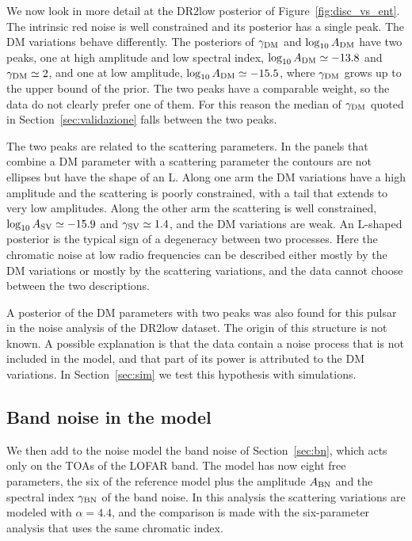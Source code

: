 We now look in more detail at the DR2low posterior of
Figure~\ref{fig:disc_vs_ent}. The intrinsic red noise is well constrained
and its posterior has a single peak. The DM variations behave differently.
The posteriors of $\gamma_{\rm DM}$ and $\log_{10}A_{\rm DM}$ have two
peaks, one at high amplitude and low spectral index,
$\log_{10}A_{\rm DM} \simeq -13.8$ and $\gamma_{\rm DM} \simeq 2$, and one
at low amplitude, $\log_{10}A_{\rm DM} \simeq -15.5$, where
$\gamma_{\rm DM}$ grows up to the upper bound of the prior. The two peaks
have a comparable weight, so the data do not clearly prefer one of them.
For this reason the median of $\gamma_{\rm DM}$ quoted in
Section~\ref{sec:validazione} falls between the two peaks.

The two peaks are related to the scattering parameters. In the panels that
combine a DM parameter with a scattering parameter the contours are not
ellipses but have the shape of an L. Along one arm the DM variations have
a high amplitude and the scattering is poorly constrained, with a tail
that extends to very low amplitudes. Along the other arm the scattering is
well constrained, $\log_{10}A_{\rm SV} \simeq -15.9$ and
$\gamma_{\rm SV} \simeq 1.4$, and the DM variations are weak. An L-shaped
posterior is the typical sign of a degeneracy between two processes. Here
the chromatic noise at low radio frequencies can be described either
mostly by the DM variations or mostly by the scattering variations, and
the data cannot choose between the two descriptions.

A posterior of the DM parameters with two peaks was also found for this
pulsar in the noise analysis of the DR2low dataset. The origin of this
structure is not known. A possible explanation is that the data contain a
noise process that is not included in the model, and that part of its
power is attributed to the DM variations. In Section~\ref{sec:sim} we
test this hypothesis with simulations.

\subsection{Band noise in the model} \label{sec:bn_reali}

We then add to the noise model the band noise of Section~\ref{sec:bn},
which acts only on the TOAs of the LOFAR band. The model has now eight free
parameters, the six of the reference model plus the amplitude
$A_{\rm BN}$ and the spectral index $\gamma_{\rm BN}$ of the band noise. In
this analysis the scattering variations are modeled with $\alpha = 4.4$,
and the comparison is made with the six-parameter analysis that uses the
same chromatic index.

